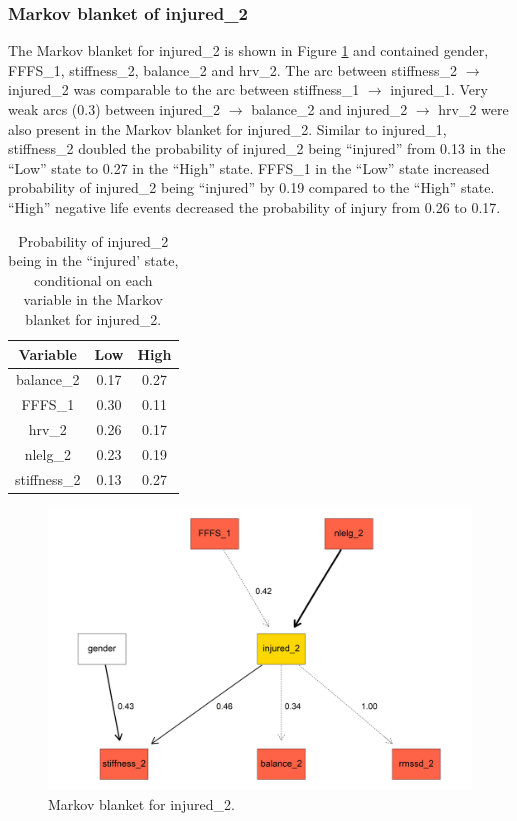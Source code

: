 \documentclass[
  english,
  man,floatsintext]{apa6}
\begin{document}
\hypertarget{markov-blanket-of-injured_2}{%
\subsubsection{Markov blanket of injured\_2}\label{markov-blanket-of-injured_2}}

The Markov blanket for injured\_2 is shown in Figure \ref{fig:fig8} and contained gender, FFFS\_1, stiffness\_2, balance\_2 and hrv\_2.
The arc between stiffness\_2 \(\rightarrow\) injured\_2 was comparable to the arc between stiffness\_1 \(\rightarrow\) injured\_1.
Very weak arcs (0.3) between injured\_2 \(\rightarrow\) balance\_2 and injured\_2 \(\rightarrow\) hrv\_2 were also present in the Markov blanket for injured\_2.
Similar to injured\_1, stiffness\_2 doubled the probability of injured\_2 being ``injured'' from 0.13 in the ``Low'' state to 0.27 in the ``High'' state.
FFFS\_1 in the ``Low'' state increased probability of injured\_2 being ``injured'' by 0.19 compared to the ``High'' state.
``High'' negative life events decreased the probability of injury from 0.26 to 0.17.

\begin{table}[H]

\caption{\label{tab:table7}Probability of injured\_2 being in the ``injured' state, conditional on each variable in the Markov blanket for injured\_2.}
\centering
\begin{tabular}[t]{c|c|c}
\hline
\textbf{Variable} & \textbf{Low} & \textbf{High}\\
\hline
balance\_2 & 0.17 & 0.27\\
\hline
FFFS\_1 & 0.30 & 0.11\\
\hline
hrv\_2 & 0.26 & 0.17\\
\hline
nlelg\_2 & 0.23 & 0.19\\
\hline
stiffness\_2 & 0.13 & 0.27\\
\hline
\end{tabular}
\end{table}

\begin{figure}

{\centering \includegraphics[width=1\linewidth]{figures_doc/Fig8} 

}

\caption{Markov blanket for injured\_2.}\label{fig:fig8}
\end{figure}
\end{document}
